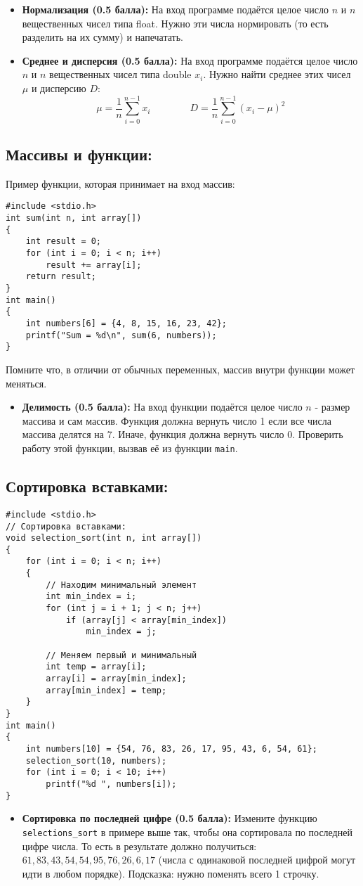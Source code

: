 \documentclass{article}
\begin{document}
\begin{itemize}

\item \textbf{Нормализация (0.5 балла):} На вход программе подаётся целое число $n$ и $n$ вещественных чисел типа float. Нужно эти числа нормировать (то есть разделить на их сумму) и напечатать.
\item \textbf{Среднее и дисперсия (0.5 балла):} На вход программе подаётся целое число $n$ и $n$ вещественных чисел типа double ${x_i}$. Нужно найти среднее этих чисел $\mu$ и дисперсию $D$: 
$$\mu = \frac{1}{n}\sum_{i=0}^{n-1}x_i \quad \quad \quad \quad D = \frac{1}{n}\sum_{i=0}^{n-1}(x_i - \mu)^2$$
\end{itemize}

\subsection*{Массивы и функции:}
Пример функции, которая принимает на вход массив:
\begin{lstlisting}
#include <stdio.h>
int sum(int n, int array[])
{
	int result = 0;
	for (int i = 0; i < n; i++)
		result += array[i];
	return result;
}
int main()
{
	int numbers[6] = {4, 8, 15, 16, 23, 42};
	printf("Sum = %d\n", sum(6, numbers));
}
\end{lstlisting}
Помните что, в отличии от обычных переменных, массив внутри функции может меняться.
\begin{itemize}
\item \textbf{Делимость (0.5 балла):} На вход функции подаётся целое число $n$ - размер массива и сам массив. Функция должна вернуть число 1 если все числа массива делятся на 7. Иначе, функция должна вернуть число 0. Проверить работу этой функции, вызвав её из функции \texttt{main}.
\end{itemize}

\newpage
\subsection*{Сортировка вставками:}
\begin{lstlisting}
#include <stdio.h>
// Сортировка вставками:
void selection_sort(int n, int array[])
{
	for (int i = 0; i < n; i++)
	{
		// Находим минимальный элемент
		int min_index = i;
		for (int j = i + 1; j < n; j++)
			if (array[j] < array[min_index])
				min_index = j;
				
		// Меняем первый и минимальный
		int temp = array[i];
		array[i] = array[min_index];
		array[min_index] = temp;
	}
}
int main()
{
	int numbers[10] = {54, 76, 83, 26, 17, 95, 43, 6, 54, 61};
	selection_sort(10, numbers);
	for (int i = 0; i < 10; i++)
		printf("%d ", numbers[i]);
}
\end{lstlisting}
\begin{itemize}
\item \textbf{Сортировка по последней цифре (0.5 балла):} Измените функцию \texttt{selections\_sort} в примере выше так, чтобы она сортировала по последней цифре числа. То есть в результате должно получиться: $61, 83, 43, 54, 54, 95, 76, 26, 6, 17$ (числа с одинаковой последней цифрой могут идти в любом порядке). Подсказка: нужно поменять всего 1 строчку.
\end{itemize}
\end{document}
